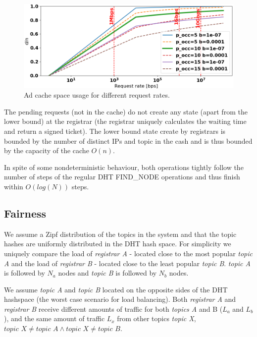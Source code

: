 \begin{figure}[t]
    \includegraphics[width=1\linewidth]{img/cache_size_limit}
    \caption{Ad cache space usage for different request rates.
    }
    \label{fig:cache_size_limit}
\end{figure}
The pending requests (\ie not in the cache) do not create any state (apart from the lower bound) at the registrar (\ie the registrar uniquely calculates the waiting time and return a signed ticket). The lower bound state create by registrars is bounded by the number of distinct IPs and topic in the cash and is thus bounded by the capacity of the cache $O(n)$.

In spite of some nondeterministic behaviour, both operations tightly follow the number of steps of the regular DHT FIND\_NODE operations and thus finish within $O(log(N))$ steps.

\subsection{Fairness}
We assume a Zipf distribution of the topics in the system and that the topic hashes are uniformly distributed in the DHT hash space. For simplicity we uniquely compare the load of \emph{registrar A} - located close to the most popular \emph{topic A} and the load of \emph{registrar B} - located close to the least popular \emph{topic B}. \emph{topic A} is followed by $N_a$ nodes and \emph{topic B} is followed by $N_b$ nodes. 

We assume \emph{topic A} and \emph{topic B} located on the opposite sides of the DHT hashspace (the worst case scenario for load balancing). Both \emph{registrar A} and \emph{registrar B} receive different amounts of traffic for both \emph{topics A} and {B} ($L_a$ and $L_b$), and the same amount of traffic $L_x$ from other topics \emph{topic X}, $\textit{topic X} \neq \textit{topic A} \land  \textit{topic X} \neq \textit{topic B}$. 

